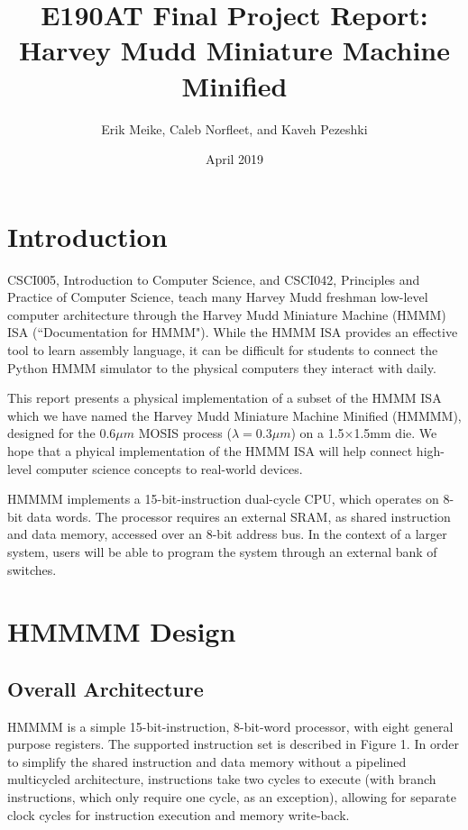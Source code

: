 \documentclass[12pt]{article}
\title{E190AT Final Project Report:\\%
       \textbf{Harvey Mudd Miniature Machine Minified}}
\author{Erik Meike, Caleb Norfleet, and Kaveh Pezeshki }
\date{April 2019}
\begin{document}
\maketitle
\thispagestyle{empty}
\clearpage
{}

\section{Introduction}

CSCI005, Introduction to Computer Science, and CSCI042, Principles and Practice of Computer Science, teach many Harvey Mudd freshman low-level computer architecture through the Harvey Mudd Miniature Machine (HMMM) ISA (``Documentation for HMMM"). While the HMMM ISA provides an effective tool to learn assembly language, it can be difficult for students to connect the Python HMMM simulator to the physical computers they interact with daily.

This report presents a physical implementation of a subset of the HMMM ISA which we have named the Harvey Mudd Miniature Machine Minified (HMMMM), designed for the 0.6$\mu m$ MOSIS process ($\lambda=0.3\mu m$) on a 1.5$\times$1.5mm die. We hope that a phyical implementation of the HMMM ISA will help connect high-level computer science concepts to real-world devices.

HMMMM implements a 15-bit-instruction dual-cycle CPU, which operates on 8-bit data words. The processor requires an external SRAM, as shared instruction and data memory, accessed over an 8-bit address bus. In the context of a larger system, users will be able to program the system through an external bank of switches.

\section{HMMMM Design}

\subsection{Overall Architecture}

HMMMM is a simple 15-bit-instruction, 8-bit-word processor, with eight general purpose registers. The supported instruction set is described in Figure 1. In order to simplify the shared instruction and data memory without a pipelined multicycled architecture, instructions take two cycles to execute (with branch instructions, which only require one cycle, as an exception), allowing for separate clock cycles for instruction execution and memory write-back.
\end{document}
